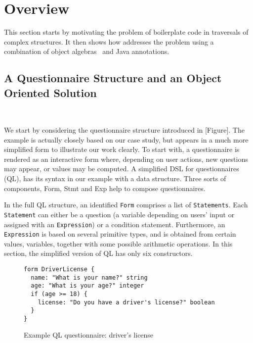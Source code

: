 \section{Overview}\label{subsec:overview}

This section starts by motivating the problem of boilerplate code in
traversals of complex structures. It then shows how \name addresses
the problem using a combination of object algebras~\cite{bruno12oa}
and Java annotations.

\subsection{A Questionnaire Structure and an Object Oriented Solution}

\\

We start by considering the questionnaire structure introduced in [Figure]. The example is actually closely based on our case study, but appears in a much more simplified form to illustrate our work clearly. To start with, a questionnaire is rendered as an interactive form where, depending on user actions, new questions may appear, or values may be computed. A simplified DSL for questionnaires (QL), has its syntax in our example with a data structure. Three sorts of components, Form, Stmt and Exp help to compose questionnaires.

In the full QL structure, an identified \lstinline{Form} comprises a list of \lstinline{Statements}. Each \lstinline{Statement} can either be a question (a variable depending on users' input or assigned with an \lstinline{Expression}) or a condition statement. Furthermore, an \lstinline{Expression} is based on several primitive types, and is obtained from certain values, variables, together with some possible arithmetic operations. In this section, the simplified version of QL has only six constructors.

\begin{figure}[t]
\nocaptionrule
\begin{lstlisting}[language=ql]
form DriverLicense {
  name: "What is your name?" string
  age: "What is your age?" integer
  if (age >= 18) {
    license: "Do you have a driver's license?" boolean
  }
}
\end{lstlisting}
\caption{Example QL questionnaire: driver's license}
\label{driver_license}
\end{figure}


